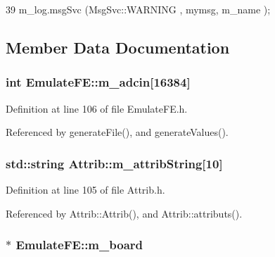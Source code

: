 \begin{DoxyCode}
39 { m_log.msgSvc (MsgSvc::WARNING , mymsg, m_name ); }
\end{DoxyCode}


\subsection{Member Data Documentation}
\hypertarget{classEmulateFE_a647be38c790d5c0088e971aa28989589}{
\subsubsection[{m\_\-adcin}]{\setlength{\rightskip}{0pt plus 5cm}int {\bf EmulateFE::m\_\-adcin}\mbox{[}16384\mbox{]}}}
\label{classEmulateFE_a647be38c790d5c0088e971aa28989589}


Definition at line 106 of file EmulateFE.h.

Referenced by generateFile(), and generateValues().\hypertarget{classAttrib_a3414521d7a82476e874b25a5407b5e63}{
\subsubsection[{m\_\-attribString}]{\setlength{\rightskip}{0pt plus 5cm}std::string {\bf Attrib::m\_\-attribString}\mbox{[}10\mbox{]}}}
\label{classAttrib_a3414521d7a82476e874b25a5407b5e63}


Definition at line 105 of file Attrib.h.

Referenced by Attrib::Attrib(), and Attrib::attributs().\hypertarget{classEmulateFE_a6f3c6a104235b167e4465f4169cf8304}{
\subsubsection[{m\_\-board}]{$\ast$ {\bf EmulateFE::m\_\-board}}}
\label{classEmulateFE_a6f3c6a104235b167e4465f4169cf8304}


